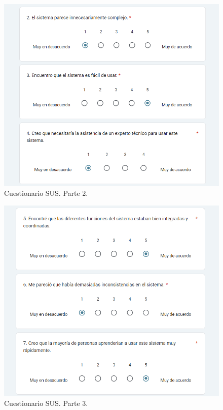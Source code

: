 \begin{figure}[h]
    \centering
    \includegraphics[width=1\textwidth]{img/G1_Resultados/sus2.png}
    \caption{Cuestionario SUS. Parte 2.}
    \label{fig:sus2}
\end{figure}

\begin{figure}[h]
    \centering
    \includegraphics[width=1\textwidth]{img/G1_Resultados/sus3.png}
    \caption{Cuestionario SUS. Parte 3.}
    \label{fig:sus3}
\end{figure}

